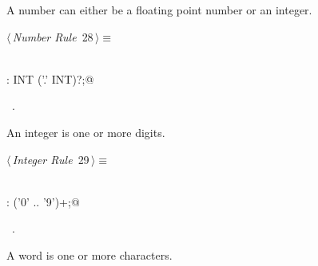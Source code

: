 \documentclass[a4paper]{report}
\begin{document}
A number can either be a floating point number or an integer.
\begin{flushleft} \small
\begin{minipage}{\linewidth}\label{scrap28}\raggedright\small
{} $\langle\,${\itshape Number Rule}\nobreak\ {\footnotesize {28}}$\,\rangle\equiv$
\vspace{-1ex}
\begin{list}{}{} \item
\mbox{}\verb@@\\
\mbox{}\verb@NUMBER: INT ('.' INT)?;@\\
\mbox{}\verb@@{\NWsep}
\end{list}
\vspace{-1.5ex}
\footnotesize
\begin{list}{}{\setlength{\itemsep}{-\parsep}\setlength{\itemindent}{-\leftmargin}}
\item \NWtxtMacroRefIn\ .

\item{}
\end{list}
\end{minipage}\vspace{4ex}
\end{flushleft}
An integer is one or more digits.
\begin{flushleft} \small
\begin{minipage}{\linewidth}\label{scrap29}\raggedright\small
{} $\langle\,${\itshape Integer Rule}\nobreak\ {\footnotesize {29}}$\,\rangle\equiv$
\vspace{-1ex}
\begin{list}{}{} \item
\mbox{}\verb@@\\
\mbox{}\verb@INT: ('0' .. '9')+;@\\
\mbox{}\verb@@{\NWsep}
\end{list}
\vspace{-1.5ex}
\footnotesize
\begin{list}{}{\setlength{\itemsep}{-\parsep}\setlength{\itemindent}{-\leftmargin}}
\item \NWtxtMacroRefIn\ .

\item{}
\end{list}
\end{minipage}\vspace{4ex}
\end{flushleft}
A word is one or more characters.
\end{document}
